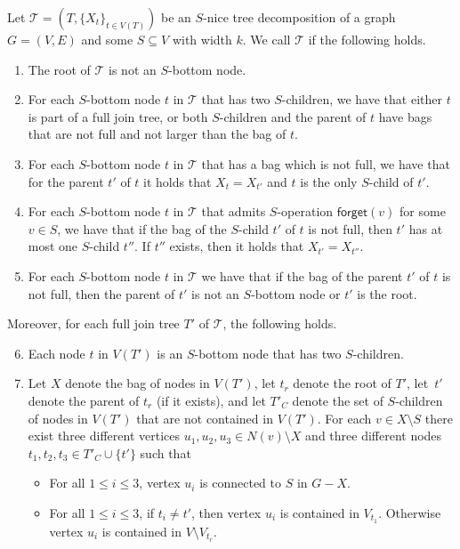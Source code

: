 \documentclass[a4paper,UKenglish,cleveref, autoref, thm-restate, numberwithinsect]{lipics-v2021}
\newcommand{\forget}{\mathsf{forget}}
\newcommand{\slim}{\text{slim}\xspace}
\begin{document}
\begin{definition}\label{def:slimtd}
Let $\mathcal{T}=(T,\{X_t\}_{t\in V(T)})$ be an $S$-nice tree decomposition of a graph $G=(V,E)$ and some $S\subseteq V$ with width $k$. We call $\mathcal{T}$ \emph{\slim} if the following holds.
\begin{enumerate}
\item The root of $\mathcal{T}$ is not an $S$-bottom node.\label{cond:slim:1}
\item For each $S$-bottom node $t$ in $\mathcal{T}$ that has two $S$-children, we have that either $t$ is part of a full join tree, or both $S$-children and the parent of $t$ have bags that are not full and not larger than the bag of $t$.\label{cond:slim:2}
\item For each $S$-bottom node $t$ in $\mathcal{T}$ that has a bag which is not full, we have that for the parent $t'$ of $t$ it holds that $X_t=X_{t'}$ and $t$ is the only $S$-child of $t'$.\label{cond:slim:3}
\item For each $S$-bottom node $t$ in $\mathcal{T}$ that admits $S$-operation $\forget(v)$ for some $v\in S$, we have that if the bag of the $S$-child $t'$ of $t$ is not full, then $t'$ has at most one $S$-child $t''$. If $t''$ exists, then it holds that $X_{t'}=X_{t''}$.\label{cond:slim:35}
\item For each $S$-bottom node $t$ in $\mathcal{T}$ we have that if the bag of the parent $t'$ of $t$ is not full, then the parent of $t'$ is not an $S$-bottom node or $t'$ is the root.\label{cond:slim:4}
\end{enumerate}
Moreover, for each full join tree $T'$ of $\mathcal{T}$, the following holds.
\begin{enumerate}\setcounter{enumi}{5}
\item Each node $t$ in $V(T')$ is an $S$-bottom node that has two $S$-children.\label{cond:slim:5}
\item Let $X$ denote the bag of nodes in $V(T')$, let $t_r$ denote the root of $T'$, let~$t'$ denote the parent of $t_r$ (if it exists), and let $T'_C$ denote the set of $S$-children of nodes in $V(T')$ that are not contained in $V(T')$. For each $v\in X\setminus S$ there exist three different vertices $u_1,u_2,u_3\in N(v)\setminus X$ and three different nodes $t_1,t_2,t_3\in T'_C\cup\{t'\}$ such that \label{cond:slim:6}
\begin{itemize}
\item For all $1\le i\le 3$, vertex $u_i$ is connected to $S$ in $G-X$.\label{cond:slim:6a}

\item For all $1\le i\le 3$, if $t_i\neq t'$, then vertex $u_i$ is contained in $V_{t_1}$. Otherwise vertex $u_i$ is contained in $V\setminus V_{t_r}$.\label{cond:slim:6b}
\end{itemize}
\end{enumerate}
\end{definition}
\end{document}
